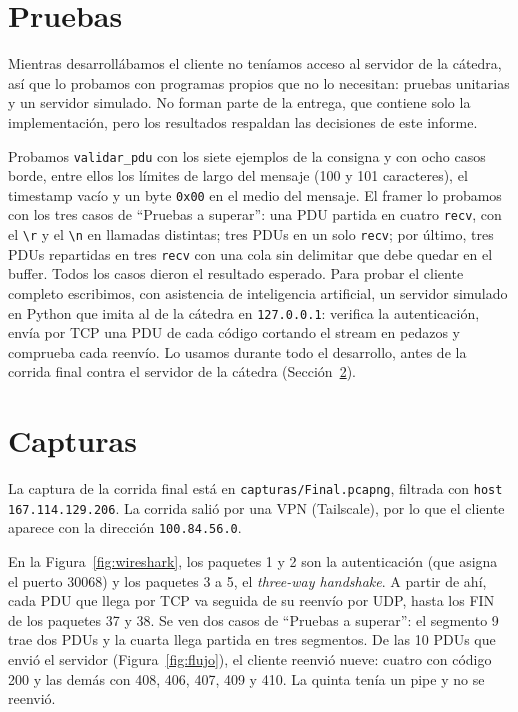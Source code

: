 \documentclass[11pt,a4paper]{article}
\newcommand{\code}[1]{\texttt{#1}}
\begin{document}
\section{Pruebas}
\label{sec:pruebas}

Mientras desarrollábamos el cliente no teníamos acceso al servidor de la cátedra, así que lo probamos con programas
propios que no lo necesitan: pruebas unitarias y un servidor simulado. No forman parte de la entrega, que contiene
solo la implementación, pero los resultados respaldan las decisiones de este informe.

Probamos \code{validar\_pdu} con los siete ejemplos de la consigna y con ocho casos borde, entre ellos los límites
de largo del mensaje (100 y 101 caracteres), el timestamp vacío y un byte \code{0x00} en el medio del mensaje. El
framer lo probamos con los tres casos de ``Pruebas a superar'': una PDU partida en cuatro \code{recv}, con el
\code{\textbackslash r} y el \code{\textbackslash n} en llamadas distintas; tres PDUs en un solo \code{recv}; por
último, tres PDUs repartidas en tres \code{recv} con una cola sin delimitar que debe quedar en el buffer. Todos los
casos dieron el resultado esperado. Para probar el cliente completo escribimos, con asistencia de inteligencia
artificial, un servidor simulado en Python que imita al de la cátedra en \code{127.0.0.1}: verifica la
autenticación, envía por TCP una PDU de cada código cortando el stream en pedazos y comprueba cada reenvío. Lo
usamos durante todo el desarrollo, antes de la corrida final contra el servidor de la cátedra
(Sección~\ref{sec:capturas}).

\section{Capturas}
\label{sec:capturas}

La captura de la corrida final está en \code{capturas/Final.pcapng}, filtrada con \code{host 167.114.129.206}. La corrida salió por una VPN
(Tailscale), por lo que el cliente aparece con la dirección \code{100.84.56.0}.

En la Figura~\ref{fig:wireshark}, los paquetes 1 y 2 son la autenticación (que asigna el puerto 30068) y los
paquetes 3 a 5, el \textit{three-way handshake}. A partir de ahí, cada PDU que llega por TCP va seguida de su reenvío
por UDP, hasta los FIN de los paquetes 37 y 38. Se ven dos casos de ``Pruebas a superar'': el segmento 9 trae dos
PDUs y la cuarta llega partida en tres segmentos. De las 10 PDUs que envió el servidor (Figura~\ref{fig:flujo}), el
cliente reenvió nueve: cuatro con código 200 y las demás con 408, 406, 407, 409 y 410. La quinta tenía un pipe y no
se reenvió.
\end{document}
